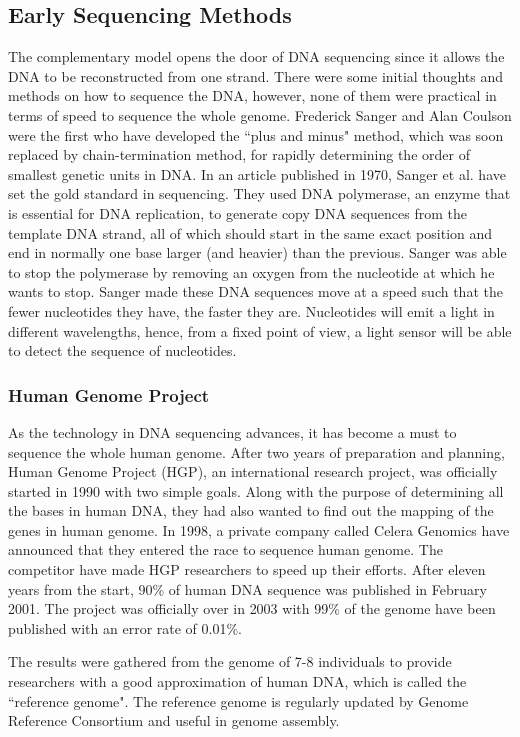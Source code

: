 \subsection{Early Sequencing Methods}
The complementary model opens the door of DNA sequencing since it allows the DNA to be reconstructed from one strand. There were some initial thoughts and methods on how to sequence the DNA, however, none of them were practical in terms of speed to sequence the whole genome. Frederick Sanger and Alan Coulson were the first who have developed the ``plus and minus" method, which was soon replaced by chain-termination method, for rapidly determining the order of smallest genetic units in DNA\cite{sanger1975rapid}. In an article published in 1970, Sanger et al. have set the gold standard in sequencing. They used DNA polymerase, an enzyme that is essential for DNA replication, to generate copy DNA sequences from the template DNA strand, all of which should start in the same exact position and end in normally one base larger (and heavier) than the previous. Sanger was able to stop the polymerase by removing an oxygen from the nucleotide at which he wants to stop. Sanger made these DNA sequences move at a speed such that the fewer nucleotides they have, the faster they are. Nucleotides will emit a light in different wavelengths, hence, from a fixed point of view, a light sensor will be able to detect the sequence of nucleotides. 

\subsubsection{Human Genome Project}
As the technology in DNA sequencing advances, it has become a must to sequence the whole human genome. After two years of preparation and planning, Human Genome Project (HGP), an international research project, was officially started in 1990 with two simple goals. Along with the purpose of determining all the bases in human DNA, they had also wanted to find out the mapping of the genes in human genome. In 1998, a private company called Celera Genomics have announced that they entered the race to sequence human genome. The competitor have made HGP researchers to speed up their efforts. After eleven years from the start, 90\% of human DNA sequence was published in February 2001. The project was officially over in 2003 with 99\% of the genome have been published with an error rate of 0.01\%.

The results were gathered from the genome of 7-8 individuals to provide researchers with a good approximation of human DNA, which is called the ``reference genome". The reference genome is regularly updated by Genome Reference Consortium and useful in genome assembly.

